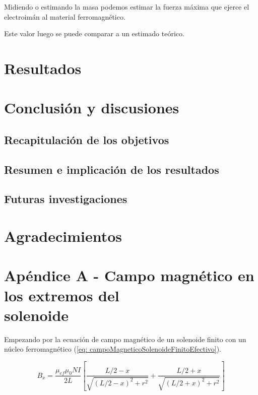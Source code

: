 \documentclass[a4paper,12pt]{article}
\begin{document}
        Midiendo o estimando la masa podemos estimar la fuerza máxima que ejerce el electroimán al material ferromagnético.

        Este valor luego se puede comparar a un estimado teórico.

\section*{Resultados}

    

\section*{Conclusión y discusiones}

    \subsection*{Recapitulación de los objetivos}



    \subsection*{Resumen e implicación de los resultados}



    \subsection*{Futuras investigaciones}

        

\section*{Agradecimientos}

    

\section*{Apéndice A - Campo magnético en los extremos del \\solenoide}

Empezando por la ecuación de campo magnético de un solenoide finito con un núcleo ferromagnético (\ref{eq: campoMagneticoSolenoideFinitoEfectivo}).

    \begin{equation*}
        B_x = \frac{\mu_{ef}\mu_0 N I}{2L} \left[ \frac{L/2 - x}{\sqrt{(L/2 - x)^2 + r^2}} + \frac{L/2 + x}{\sqrt{(L/2 + x)^2 + r^2}} \right]
    \end{equation*}
\end{document}
